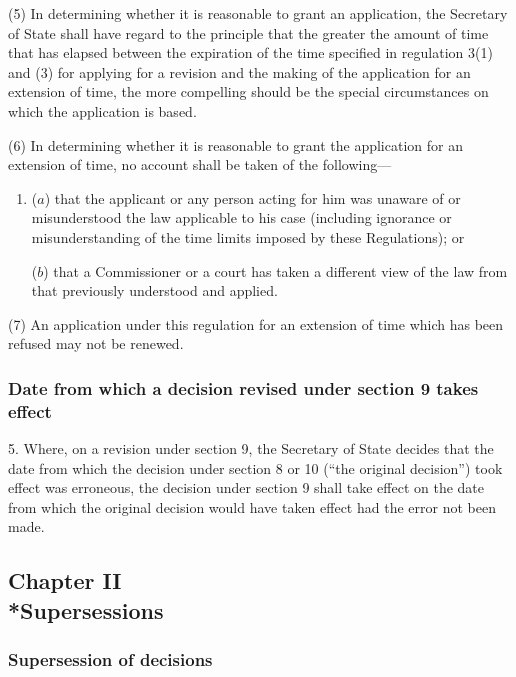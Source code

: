 \documentclass[12pt,a4paper]{article}
\begin{document}
(5) In determining whether it is reasonable to grant an application, the Secretary of State shall have regard to the principle that the greater the amount of time that has elapsed between the expiration of the time specified in regulation 3(1) and (3) for applying for a revision and the making of the application for an extension of time, the more compelling should be the special circumstances on which the application is based.

(6) In determining whether it is reasonable to grant the application for an extension of time, no account shall be taken of the following—
\begin{enumerate}\item[]
($a$) that the applicant or any person acting for him was unaware of or misunderstood the law applicable to his case (including ignorance or misunderstanding of the time limits imposed by these Regulations); or

($b$) that a Commissioner or a court has taken a different view of the law from that previously understood and applied.
\end{enumerate}

(7) An application under this regulation for an extension of time which has been refused may not be renewed.

\subsubsection[5. Date from which a decision revised under section 9 takes effect]{Date from which a decision revised under section 9 takes effect}

5.  Where, on a revision under section 9, the Secretary of State decides that the date from which the decision under section 8 or 10 (“the original decision”) took effect was erroneous, the decision under section 9 shall take effect on the date from which the original decision would have taken effect had the error not been made.

\subsection[Chapter II --- Supersessions]{Chapter II\\*Supersessions}

\subsubsection[6. Supersession of decisions]{Supersession of decisions}
\end{document}
